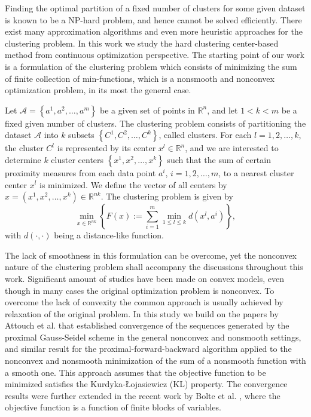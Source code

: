 \documentclass[12pt]{article}
\numberwithin{equation}{section}
\begin{document}
Finding the optimal partition of a fixed number of clusters for some given dataset is known to be a NP-hard problem, and hence cannot be solved efficiently. There exist many approximation algorithms and even more heuristic approaches for the clustering problem. In this work we study the hard clustering center-based method from continuous optimization perspective. The starting point of our work is a formulation of the clustering problem which consists of minimizing the sum of finite collection of min-functions, which is a nonsmooth and nonconvex optimization problem, in its most the general case.

Let $\mathcal{A}= \left\lbrace a^1, a^2, \ldots ,a^m \right\rbrace$ be a given set of points in $\mathbb{R}^n$, and let $1 < k < m$ be a fixed given number of clusters. The clustering problem consists of partitioning the dataset $\mathcal{A}$ into $k$ subsets $\left\lbrace C^1, C^2, \ldots ,C^k \right\rbrace$, called clusters. For each $l=1, 2, \ldots ,k$, the cluster $C^l$ is represented by its center $x^l \in \mathbb{R}^n$, and we are interested to determine $k$ cluster centers $\left\lbrace x^1, x^2, \ldots ,x^k \right\rbrace$ such that the sum of certain proximity measures from each data point $a^i$, $i=1, 2, \ldots ,m$, to a nearest cluster center $x^l$ is minimized. We define the vector of all centers by  $x = (x^1, x^2, \ldots , x^k) \in \mathbb{R}^{nk}$.
The clustering problem is given by
\begin{equation}
	\min\limits_{x \in \mathbb{R}^{nk}} \left\lbrace F(x) := \sum\limits_{i=1}^{m} \min\limits_{1 \le l \le k} d(x^l,a^i) \right\rbrace , \label{StateEq1}
\end{equation}
\noindent with $\textit{d}(\cdot ,\cdot)$ being a distance-like function.

The lack of smoothness in this formulation can be overcome, yet the nonconvex nature of the clustering problem shall accompany the discussions throughout this work. Significant amount of studies have been made on convex models, even though in many cases the original optimization problem is nonconvex. To overcome the lack of convexity the common approach is usually achieved by relaxation of the original problem. In this study we build on the papers by Attouch et al. \cite{AB2009, ABS2013} that established convergence of the sequences generated by the proximal Gauss-Seidel scheme in the general nonconvex and nonsmooth settings, and similar result for the proximal-forward-backward algorithm applied to the nonconvex and nonsmooth minimization of the sum of a nonsmooth function with a smooth one. This approach assumes that the objective function to be minimized satisfies the Kurdyka-{\L}ojasiewicz (KL) property. The convergence results were further extended in the recent work by Bolte et al. \cite{BST2014}, where the objective function is a function of finite blocks of variables. 
\end{document}
